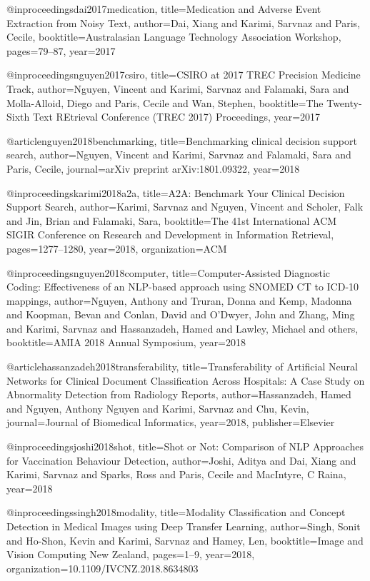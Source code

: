 @inproceedings{dai2017medication,
  title={Medication and Adverse Event Extraction from Noisy Text},
  author={Dai, Xiang and Karimi, Sarvnaz and Paris, Cecile},
  booktitle={Australasian Language Technology Association Workshop},
  pages={79--87},
  year={2017}
}

@inproceedings{nguyen2017csiro,
  title={CSIRO at 2017 TREC Precision Medicine Track},
  author={Nguyen, Vincent and Karimi, Sarvnaz and Falamaki, Sara and Molla-Alloid, Diego and Paris, Cecile and Wan, Stephen},
  booktitle={The Twenty-Sixth Text REtrieval Conference (TREC 2017) Proceedings},
  year={2017}
}

@article{nguyen2018benchmarking,
  title={Benchmarking clinical decision support search},
  author={Nguyen, Vincent and Karimi, Sarvnaz and Falamaki, Sara and Paris, Cecile},
  journal={arXiv preprint arXiv:1801.09322},
  year={2018}
}

@inproceedings{karimi2018a2a,
  title={A2A: Benchmark Your Clinical Decision Support Search},
  author={Karimi, Sarvnaz and Nguyen, Vincent and Scholer, Falk and Jin, Brian and Falamaki, Sara},
  booktitle={The 41st International ACM SIGIR Conference on Research and Development in Information Retrieval},
  pages={1277--1280},
  year={2018},
  organization={ACM}
}

@inproceedings{nguyen2018computer,
  title={Computer-Assisted Diagnostic Coding: Effectiveness of an NLP-based approach using SNOMED CT to ICD-10 mappings},
  author={Nguyen, Anthony and Truran, Donna and Kemp, Madonna and Koopman, Bevan and Conlan, David and O’Dwyer, John and Zhang, Ming and Karimi, Sarvnaz and Hassanzadeh, Hamed and Lawley, Michael and others},
  booktitle={AMIA 2018 Annual Symposium},
  year={2018}
}

@article{hassanzadeh2018transferability,
  title={Transferability of Artificial Neural Networks for Clinical Document Classification Across Hospitals: A Case Study on Abnormality Detection from Radiology Reports},
  author={Hassanzadeh, Hamed and Nguyen, Anthony Nguyen and Karimi, Sarvnaz and Chu, Kevin},
  journal={Journal of Biomedical Informatics},
  year={2018},
  publisher={Elsevier}
}

@inproceedings{joshi2018shot,
  title={Shot or Not: Comparison of NLP Approaches for Vaccination Behaviour Detection},
  author={Joshi, Aditya and Dai, Xiang and Karimi, Sarvnaz and Sparks, Ross and Paris, Cecile and MacIntyre, C Raina},
  year={2018}
}

@inproceedings{singh2018modality,
  title={Modality Classification and Concept Detection in Medical Images using Deep Transfer Learning},
  author={Singh, Sonit and Ho-Shon, Kevin and Karimi, Sarvnaz and Hamey, Len},
  booktitle={Image and Vision Computing New Zealand},
  pages={1--9},
  year={2018},
  organization={10.1109/IVCNZ.2018.8634803}
}

